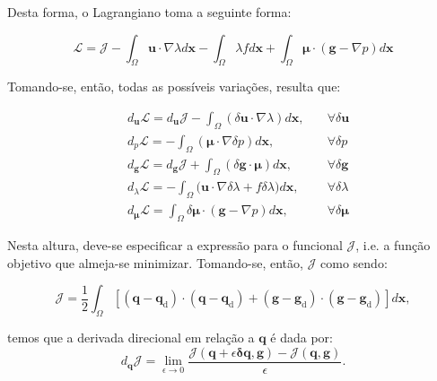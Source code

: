 Desta forma, o Lagrangiano toma a seguinte forma: 

\begin{equation}
	\boldsymbol{\mathcal{L}} = \boldsymbol{\mathcal{J}}  - \int_{\Omega} \mathbf{u} \cdot \nabla \lambda d\mathbf{x} - \int_{\Omega} \lambda f d\mathbf{x} + \int_{\Omega} \boldsymbol{\mu} \cdot (\textbf{g} -  \nabla p)d\mathbf{x}
\end{equation}

Tomando-se, então, todas as possíveis variações, resulta que:

\begin{equation}
	\begin{aligned}
		&d_{\mathbf{u}}\boldsymbol{\mathcal{L}} = d_{\mathbf{u}}\boldsymbol{\mathcal{J}} - \int_{\Omega}(\delta \mathbf{u} \cdot \nabla \lambda )d\mathbf{x}, &\quad \forall \delta \mathbf{u} \\
		&d_{p}\boldsymbol{\mathcal{L}} =  - \int_{\Omega}( \boldsymbol{\mu} \cdot  \nabla \delta p )d\mathbf{x}, &\quad \forall \delta p \\
		&d_{\mathbf{g}}\boldsymbol{\mathcal{L}} = d_{\mathbf{g}}\boldsymbol{\mathcal{J}}  + \int_{\Omega} (\delta \mathbf{g} \cdot \boldsymbol{\mu})d\mathbf{x}, &\quad \forall \delta \mathbf{g} \\
		&d_{\lambda}\boldsymbol{\mathcal{L}} = -\int_{\Omega} \big(\mathbf{u} \cdot \nabla \delta \lambda + f \delta \lambda \big)d\mathbf{x}, &\quad \forall \delta \lambda \\
		&d_{\boldsymbol{\mu}}\boldsymbol{\mathcal{L}} = \int_{\Omega} \delta \boldsymbol{\mu} \cdot (\textbf{g} -  \nabla p)d\mathbf{x}, &\quad \forall \delta \boldsymbol{\mu}
	\end{aligned}
\end{equation}


Nesta altura, deve-se especificar a expressão para o funcional $\boldsymbol{\mathcal{J}}$, i.e. a função objetivo que almeja-se minimizar. Tomando-se, então, $\boldsymbol{\mathcal{J}} $ como sendo:

\begin{equation}
	\boldsymbol{\mathcal{J}} = \frac{1}{2} \int_{\Omega} \left[ (\mathbf{q} - \mathbf{q}_{\text{d}}) \cdot (\mathbf{q} - \mathbf{q}_{\text{d}}) + (\mathbf{g} - \mathbf{g}_{\text{d}}) \cdot (\mathbf{g} - \mathbf{g}_{\text{d}}) \right] d\mathbf{x},
\end{equation}

temos que a derivada direcional em relação a $\mathbf{q}$ é dada por:
\begin{equation}
	d_{\mathbf{q}}\boldsymbol{\mathcal{J}} = \lim_{\epsilon \to 0} \frac{\boldsymbol{\mathcal{J}}(\mathbf{q} + \epsilon \mathbf{\delta q}, \mathbf{g}) - \boldsymbol{\mathcal{J}}(\mathbf{q}, \mathbf{g})}{\epsilon}.
\end{equation}

